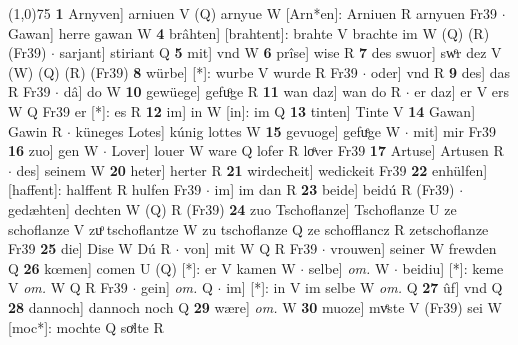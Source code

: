 \documentclass[8pt,a4paper,notitlepage]{article}
\begin{document}
\begin{table}[ht]
\begin{minipage}[t]{0.5\linewidth}
\line(1,0){75} \newline
\textbf{1} Arnyven] arniuen V (Q) arnyue W [Arn*en]: Arniuen R arnyuen Fr39  $\cdot$ Gawan] herre gawan W \textbf{4} brâhten] [brahtent]: brahte V brachte im W (Q) (R) (Fr39)  $\cdot$ sarjant] stiriant Q \textbf{5} mit] vnd W \textbf{6} prîse] wise R \textbf{7} des swuor] swͦr dez V (W) (Q) (R) (Fr39) \textbf{8} würbe] [*]: wurbe V wurde R Fr39  $\cdot$ oder] vnd R \textbf{9} des] das R Fr39  $\cdot$ dâ] do W \textbf{10} gewüege] gefuͦge R \textbf{11} wan daz] wan do R  $\cdot$ er daz] er V ers W Q Fr39 er [*]: es R \textbf{12} im] in W [in]: im Q \textbf{13} tinten] Tinte V \textbf{14} Gawan] Gawin R  $\cdot$ küneges Lotes] kúnig lottes W \textbf{15} gevuoge] gefuͤge W  $\cdot$ mit] mir Fr39 \textbf{16} zuo] gen W  $\cdot$ Lover] louer W ware Q lofer R loͤver Fr39 \textbf{17} Artuse] Artusen R  $\cdot$ des] seinem W \textbf{20} heter] herter R \textbf{21} wirdecheit] wedickeit Fr39 \textbf{22} enhülfen] [haffent]: halffent R hulfen Fr39  $\cdot$ im] im dan R \textbf{23} beide] beidú R (Fr39)  $\cdot$ gedæhten] dechten W (Q) R (Fr39) \textbf{24} zuo Tschoflanze] Tschoflanze U ze schoflanze V zuͦ tschoflantze W zu tschoflanze Q ze schofflancz R zetschoflanze Fr39 \textbf{25} die] Dise W Dú R  $\cdot$ von] mit W Q R Fr39  $\cdot$ vrouwen] seiner W frewden Q \textbf{26} kœmen] comen U (Q) [*]: er  V kamen W  $\cdot$ selbe] \textit{om.} W  $\cdot$ beidiu] [*]: keme V \textit{om.} W Q R Fr39  $\cdot$ gein] \textit{om.} Q  $\cdot$ im] [*]: in V im selbe W \textit{om.} Q \textbf{27} ûf] vnd Q \textbf{28} dannoch] dannoch noch Q \textbf{29} wære] \textit{om.} W \textbf{30} muoze] mvͤste V (Fr39) sei W [moc*]: mochte Q soͯlte R \newline
\end{minipage}
\end{table}
\end{document}
